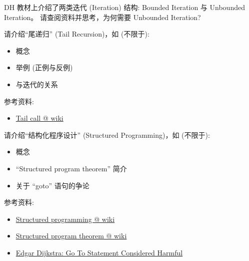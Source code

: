 \documentclass[a4paper, justified]{tufte-handout}
\begin{document}
\begin{solution}
\end{solution}

\beginoptional

\begin{problem}
  DH 教材上介绍了两类迭代 (Iteration) 结构:
  Bounded Iteration 与 Unbounded Iteration。
  请查阅资料并思考，为何需要 Unbounded Iteration?
\end{problem}

\begin{solution}
\end{solution}

\beginot

\begin{ot}[尾递归]
  请介绍``尾递归'' (Tail Recursion)，如 (不限于):
  \begin{itemize}
    \item 概念
    \item 举例 (正例与反例)
    \item 与迭代的关系
  \end{itemize}

  \noindent 参考资料:
  \begin{itemize}
    \item \href{https://en.wikipedia.org/wiki/Tail\_call}{Tail call @ wiki}
  \end{itemize}
\end{ot}

\vspace{0.50cm}
\begin{ot}[结构化程序设计]
  请介绍``结构化程序设计'' (Structured Programming)，如 (不限于):
  \begin{itemize}
    \item 概念
    \item ``Structured program theorem'' 简介
    \item 关于 ``goto'' 语句的争论
  \end{itemize}

  \noindent 参考资料:
  \begin{itemize}
    \item \href{https://en.wikipedia.org/wiki/Structured\_programming}{Structured programming @ wiki}
    \item \href{https://en.wikipedia.org/wiki/Structured\_program\_theorem}{Structured program theorem @ wiki}
    \item \href{https://homepages.cwi.nl/~storm/teaching/reader/Dijkstra68.pdf}{Edgar Dijkstra: Go To Statement Considered Harmful}
  \end{itemize}
\end{ot}
\end{document}
